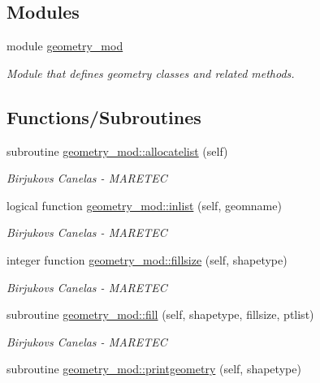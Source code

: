 \subsection*{Modules}
\begin{DoxyCompactItemize}
\item 
module \hyperlink{namespacegeometry__mod}{geometry\+\_\+mod}
\begin{DoxyCompactList}\small\item\em Module that defines geometry classes and related methods. \end{DoxyCompactList}\end{DoxyCompactItemize}
\subsection*{Functions/\+Subroutines}
\begin{DoxyCompactItemize}
\item 
subroutine \hyperlink{namespacegeometry__mod_a1b6f259b0b6be71e02ffae7670f7d8ba}{geometry\+\_\+mod\+::allocatelist} (self)
\begin{DoxyCompactList}\small\item\em Birjukovs Canelas -\/ M\+A\+R\+E\+T\+EC \end{DoxyCompactList}\item 
logical function \hyperlink{namespacegeometry__mod_a22dd77024fce56da299445a697256155}{geometry\+\_\+mod\+::inlist} (self, geomname)
\begin{DoxyCompactList}\small\item\em Birjukovs Canelas -\/ M\+A\+R\+E\+T\+EC \end{DoxyCompactList}\item 
integer function \hyperlink{namespacegeometry__mod_a92602e1198d3607613ea2722fb002685}{geometry\+\_\+mod\+::fillsize} (self, shapetype)
\begin{DoxyCompactList}\small\item\em Birjukovs Canelas -\/ M\+A\+R\+E\+T\+EC \end{DoxyCompactList}\item 
subroutine \hyperlink{namespacegeometry__mod_a095a8b47b3c23e154dcd31ab1441a065}{geometry\+\_\+mod\+::fill} (self, shapetype, fillsize, ptlist)
\begin{DoxyCompactList}\small\item\em Birjukovs Canelas -\/ M\+A\+R\+E\+T\+EC \end{DoxyCompactList}\item 
subroutine \hyperlink{namespacegeometry__mod_aed4426181ca851b41717edd50268e5f3}{geometry\+\_\+mod\+::printgeometry} (self, shapetype)

\end{DoxyCompactItemize}

